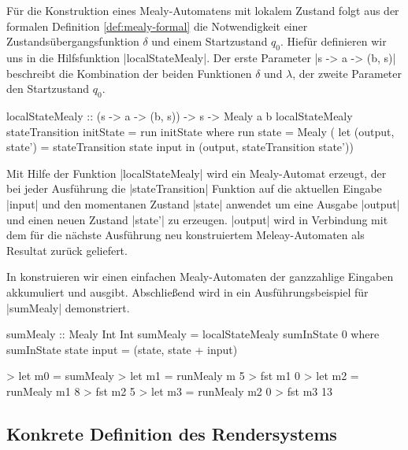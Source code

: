 Für die Konstruktion eines Mealy-Automatens mit lokalem Zustand folgt aus der formalen Definition \ref{def:mealy-formal} die Notwendigkeit einer Zustandsübergangsfunktion $\delta$ und einem Startzustand $q_0$. Hiefür definieren wir uns in  die Hilfsfunktion |localStateMealy|. Der erste Parameter |s -> a -> (b, s)| beschreibt die Kombination der beiden Funktionen $\delta$ und $\lambda$, der zweite Parameter den Startzustand $q_0$.

\begin{haskell}[label={lst:state-mealy-ctr},caption={[Konstruktion Mealy mit lokalem Zustand]Hilfsfunktion zur Konstruktion eines Mealy-Automatens mit lokalem Zustand}]
localStateMealy :: (s -> a -> (b, s)) -> s -> Mealy a b
localStateMealy stateTransition initState = run initState where
	run state = Mealy ( 
  		let (output, state') = stateTransition state input 
		in (output, stateTransition state'))
\end{haskell}

Mit Hilfe der Funktion |localStateMealy| wird ein Mealy-Automat erzeugt, der bei jeder Ausführung die |stateTransition| Funktion auf die aktuellen Eingabe |input| und den momentanen Zustand |state| anwendet um eine Ausgabe |output| und einen neuen Zustand |state'| zu erzeugen. |output| wird in Verbindung mit dem für die nächste Ausführung neu konstruiertem Meleay-Automaten als Resultat zurück geliefert.

In  konstruieren wir einen einfachen Mealy-Automaten der ganzzahlige Eingaben akkumuliert und ausgibt. Abschließend wird in  ein Ausführungsbeispiel für |sumMealy| demonstriert.

\begin{haskell}[label={lst:state-mealy-beispiel},caption={[Beispiel Mealy-Automat mit lokalem Zustand]Beispiel Mealy-Automat mit lokalem Zustand}]
sumMealy :: Mealy Int Int
sumMealy = localStateMealy sumInState 0 where
	sumInState state input = (state, state + input)
\end{haskell}

\begin{haskell}[label={lst:state-mealy-ausfuehrung},nolol,caption={Ausführung Mealy-Automat mit lokalem Zustand}]
> let m0 = sumMealy
> let m1 = runMealy m 5
> fst m1
0
> let m2 = runMealy m1 8
> fst m2
5
> let m3 = runMealy m2 0
> fst m3
13
\end{haskell}

\subsection{Konkrete Definition des Rendersystems}
\label{sec:konkret-rendersystem}


